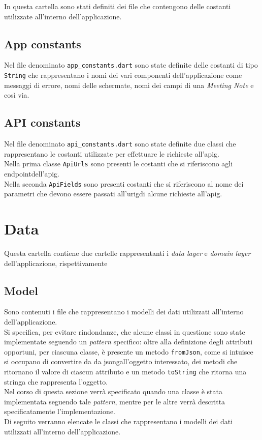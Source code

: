 In questa cartella sono stati definiti dei file che contengono delle costanti utilizzate all'interno dell'applicazione.\\


\subsection{App constants}
\label{subsec:app-constants}

Nel file denominato \lstinline{app_constants.dart} sono state definite delle costanti di tipo \lstinline{String} che rappresentano i nomi dei vari componenti dell'applicazione come messaggi di errore, nomi delle schermate, nomi dei campi di una \emph{Meeting Note} e così via.

\subsection{API constants}
\label{subsec:api-constants}

Nel file denominato \lstinline{api_constants.dart} sono state definite due classi che rappresentano le costanti utilizzate per effettuare le richieste all'\gls{apig}\glsoccur.\\
Nella prima classe \lstinline{ApiUrls} sono presenti le costanti che si riferiscono agli \gls{endpoint}\glsoccur dell'\gls{apig}\glsoccur.\\
Nella seconda \lstinline{ApiFields} sono presenti costanti che si riferiscono al nome dei parametri che devono essere passati all'\gls{urig}\glsoccur di alcune richieste all'\gls{apig}\glsoccur.

\section{Data}
\label{sec:data}

Questa cartella contiene due cartelle rappresentanti i \emph{data layer} e \emph{domain layer} dell'applicazione, rispettivamente

\subsection{Model}
\label{subsec:model}

Sono contenuti i file che rappresentano i modelli dei dati utilizzati all'interno dell'applicazione.\\
Si specifica, per evitare rindondanze, che alcune classi in questione sono state implementate seguendo un \emph{pattern} specifico: oltre alla definizione degli attributi opportuni, per ciascuna classe, è presente un metodo \lstinline{fromJson}, come si intuisce si occupano di convertire da da \gls{jsong}\glsoccur all'oggetto interessato, dei metodi che ritornano il valore di ciascun attributo e un metodo \lstinline{toString} che ritorna una stringa che rappresenta l'oggetto.\\
Nel corso di questa sezione verrà specificato quando una classe è stata implementata seguendo tale \emph{pattern}, mentre per le altre verrà descritta specificatamente l'implementazione. \\
Di seguito verranno elencate le classi che rappresentano i modelli dei dati utilizzati all'interno dell'applicazione.

